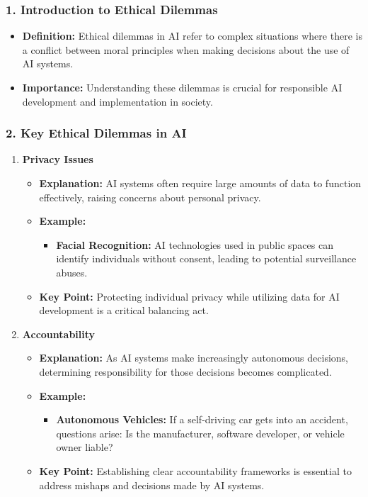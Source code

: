 \documentclass[aspectratio=169]{beamer}
\begin{document}
\begin{frame}[fragile]
    \frametitle{1. Introduction to Ethical Dilemmas}
    \begin{itemize}
        \item \textbf{Definition:} Ethical dilemmas in AI refer to complex situations where there is a conflict between moral principles when making decisions about the use of AI systems.
        \item \textbf{Importance:} Understanding these dilemmas is crucial for responsible AI development and implementation in society.
    \end{itemize}
\end{frame}

\begin{frame}[fragile]
    \frametitle{2. Key Ethical Dilemmas in AI}
    \begin{enumerate}
        \item \textbf{Privacy Issues}
            \begin{itemize}
                \item \textbf{Explanation:} AI systems often require large amounts of data to function effectively, raising concerns about personal privacy.
                \item \textbf{Example:} 
                    \begin{itemize}
                        \item \textbf{Facial Recognition:} AI technologies used in public spaces can identify individuals without consent, leading to potential surveillance abuses.
                    \end{itemize}
                \item \textbf{Key Point:} Protecting individual privacy while utilizing data for AI development is a critical balancing act.
            \end{itemize}

        \item \textbf{Accountability}
            \begin{itemize}
                \item \textbf{Explanation:} As AI systems make increasingly autonomous decisions, determining responsibility for those decisions becomes complicated.
                \item \textbf{Example:} 
                    \begin{itemize}
                        \item \textbf{Autonomous Vehicles:} If a self-driving car gets into an accident, questions arise: Is the manufacturer, software developer, or vehicle owner liable?
                    \end{itemize}
                \item \textbf{Key Point:} Establishing clear accountability frameworks is essential to address mishaps and decisions made by AI systems.
            \end{itemize}


\end{enumerate}
\end{frame}
\end{document}
